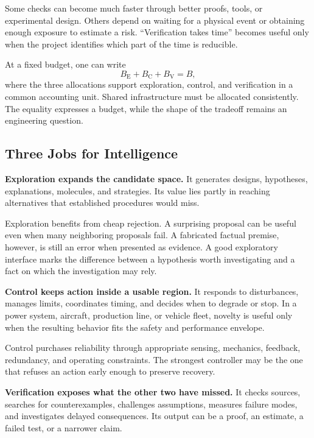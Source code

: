 Some checks can become much faster through better proofs, tools, or experimental design. Others depend on waiting for a physical event or obtaining enough exposure to estimate a risk. “Verification takes time” becomes useful only when the project identifies which part of the time is reducible.

At a fixed budget, one can write
\begin{equation}
 B_{\mathrm E}+B_{\mathrm C}+B_{\mathrm V}=B,
\end{equation}
where the three allocations support exploration, control, and verification in a common accounting unit. Shared infrastructure must be allocated consistently. The equality expresses a budget, while the shape of the tradeoff remains an engineering question.

\subsection{Three Jobs for Intelligence}

\textbf{Exploration expands the candidate space.} It generates designs, hypotheses, explanations, molecules, and strategies. Its value lies partly in reaching alternatives that established procedures would miss.

Exploration benefits from cheap rejection. A surprising proposal can be useful even when many neighboring proposals fail. A fabricated factual premise, however, is still an error when presented as evidence. A good exploratory interface marks the difference between a hypothesis worth investigating and a fact on which the investigation may rely.

\textbf{Control keeps action inside a usable region.} It responds to disturbances, manages limits, coordinates timing, and decides when to degrade or stop. In a power system, aircraft, production line, or vehicle fleet, novelty is useful only when the resulting behavior fits the safety and performance envelope.

Control purchases reliability through appropriate sensing, mechanics, feedback, redundancy, and operating constraints. The strongest controller may be the one that refuses an action early enough to preserve recovery.

\textbf{Verification exposes what the other two have missed.} It checks sources, searches for counterexamples, challenges assumptions, measures failure modes, and investigates delayed consequences. Its output can be a proof, an estimate, a failed test, or a narrower claim.

